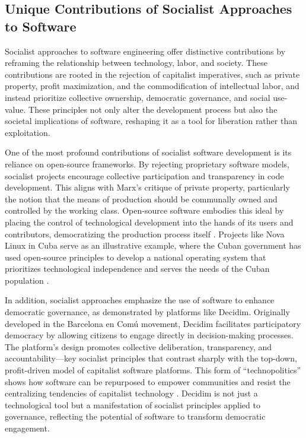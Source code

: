 \begin{refsection}
\subsection{Unique Contributions of Socialist Approaches to Software}

Socialist approaches to software engineering offer distinctive contributions by reframing the relationship between technology, labor, and society. These contributions are rooted in the rejection of capitalist imperatives, such as private property, profit maximization, and the commodification of intellectual labor, and instead prioritize collective ownership, democratic governance, and social use-value. These principles not only alter the development process but also the societal implications of software, reshaping it as a tool for liberation rather than exploitation.

One of the most profound contributions of socialist software development is its reliance on open-source frameworks. By rejecting proprietary software models, socialist projects encourage collective participation and transparency in code development. This aligns with Marx’s critique of private property, particularly the notion that the means of production should be communally owned and controlled by the working class. Open-source software embodies this ideal by placing the control of technological development into the hands of its users and contributors, democratizing the production process itself \cite[pp.~324]{marx2008}. Projects like Nova Linux in Cuba serve as an illustrative example, where the Cuban government has used open-source principles to develop a national operating system that prioritizes technological independence and serves the needs of the Cuban population \cite[pp.~156]{feinberg2016}.

In addition, socialist approaches emphasize the use of software to enhance democratic governance, as demonstrated by platforms like Decidim. Originally developed in the Barcelona en Comú movement, Decidim facilitates participatory democracy by allowing citizens to engage directly in decision-making processes. The platform's design promotes collective deliberation, transparency, and accountability—key socialist principles that contrast sharply with the top-down, profit-driven model of capitalist software platforms. This form of “technopolitics” shows how software can be repurposed to empower communities and resist the centralizing tendencies of capitalist technology \cite[pp.~29-30]{barandiaran2024}. Decidim is not just a technological tool but a manifestation of socialist principles applied to governance, reflecting the potential of software to transform democratic engagement.


\end{refsection}
